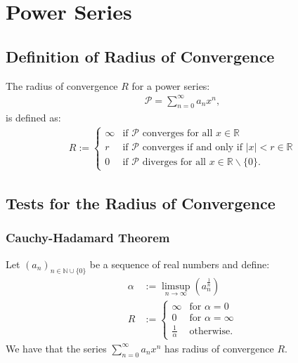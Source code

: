 \documentclass[a4paper, 12pt, twoside]{article}
\begin{document}
\section{Power Series}

\subsection{Definition of Radius of Convergence}

The radius of convergence $R$ for a power series:
\begin{align*}
      \mathcal{P} = \sum_{n = 0}^\infty a_nx^n,
\end{align*}
is defined as:
\begin{align*}
      R := \begin{cases}
            \infty & \text{if $\mathcal{P}$ converges for all } x \in \mathbb{R}                \\
            r      & \text{if $\mathcal{P}$ converges if and only if } |x| < r \in \mathbb{R}   \\
            0      & \text{if $\mathcal{P}$ diverges for all } x \in \mathbb{R}\backslash\{0\}.
      \end{cases}
\end{align*}

\newpage

\subsection{Tests for the Radius of Convergence}

\subsubsection{Cauchy-Hadamard Theorem}

Let $(a_n)_{n\in\mathbb{N}\cup\{0\}}$ be a sequence of real numbers and define:
\begin{align*}
      \alpha & := \limsup_{n\to\infty}(a_n^{\frac{1}{n}}) \\
      R      & := \begin{cases}
            \infty           & \text{for } \alpha = 0      \\
            0                & \text{for } \alpha = \infty \\
            \frac{1}{\alpha} & \text{otherwise}.
      \end{cases}
\end{align*}
We have that the series $\sum_{n = 0}^\infty a_nx^n$ has radius of convergence $R$.
\end{document}
